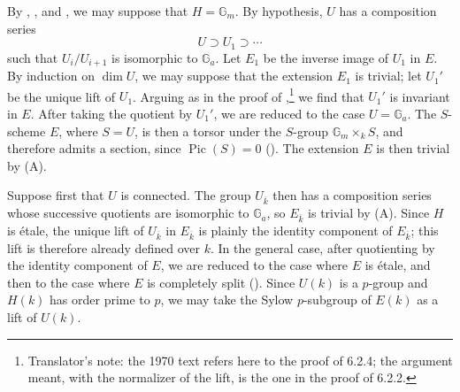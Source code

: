 By , , and , we may suppose that
\(H=\mathbb G_m\).  By hypothesis, \(U\) has a composition series
\[
  U\supset U_1\supset\cdots
\]
such that \(U_i/U_{i+1}\) is isomorphic to \(\mathbb G_a\).  Let
\(E_1\) be the inverse image of \(U_1\) in \(E\).  By induction
on \(\dim U\), we may suppose that the extension \(E_1\) is
trivial; let \(U_1'\) be the unique lift of \(U_1\).  Arguing as
in the proof of ,\footnote{Translator's note: the 1970 text refers
here to the proof of 6.2.4; the argument meant, with the normalizer of
the lift, is the one in the proof of 6.2.2.} we find that \(U_1'\) is
invariant in \(E\).  After taking the quotient by \(U_1'\), we
are reduced to the case \(U=\mathbb G_a\).  The \(S\)-scheme
\(E\), where \(S=U\), is then a torsor under the \(S\)-group
\(\mathbb G_m\times_kS\), and therefore admits a section, since
\(\operatorname{Pic}(S)=0\) ().  The extension
\(E\) is then trivial by (A).

Suppose first that \(U\) is connected.  The group
\(U_{\overline{k}}\) then has a composition series whose
successive quotients are isomorphic to \(\mathbb G_a\), so
\(E_{\overline{k}}\) is trivial by (A).  Since \(H\) is
étale, the unique lift of \(U_{\overline{k}}\) in
\(E_{\overline{k}}\) is plainly the identity component of
\(E_{\overline{k}}\); this lift is therefore already defined
over \(k\).  In the general case, after quotienting by the
identity component of \(E\), we are reduced to the case where
\(E\) is étale, and then to the case where \(E\) is completely
split ().  Since \(U(k)\) is a \(p\)-group and \(H(k)\) has
order prime to \(p\), we may take the Sylow \(p\)-subgroup of
\(E(k)\) as a lift of \(U(k)\).

